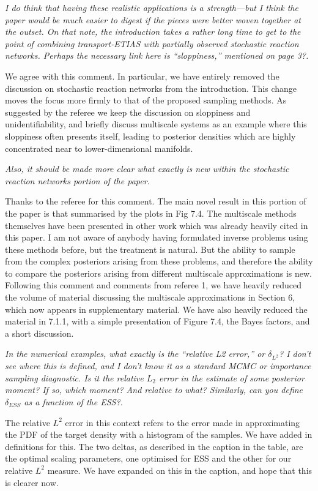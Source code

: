 \documentclass{article}
\newcommand{\comment}[2]{\vspace{0.6cm}{\bf Comment:} {\it #1.}

\vspace{0.3cm}{\bf Answer:} #2}
\begin{document}
\comment{I do think that having these realistic applications is a strength—but I think the paper would be much easier to digest if the pieces were better woven together at the outset. On that note, the introduction takes a rather long time to get to the point of combining transport-ETIAS with partially observed stochastic reaction networks. Perhaps the necessary link here is “sloppiness,” mentioned on page 3?}{We agree with this comment. In particular, we have entirely removed the discussion on stochastic reaction networks from the introduction. This change moves the focus more firmly to that of the proposed sampling methods. As suggested by the referee we keep the discussion on sloppiness and unidentifiability, and briefly discuss multiscale systems as an example where this sloppiness often presents itself, leading to posterior densities which are highly concentrated near to lower-dimensional manifolds.}



\comment{Also, it should be made more clear what exactly is new within the stochastic reaction networks portion of the paper}{Thanks to the referee for this comment. The main novel result in this portion of the paper is that summarised by the plots in Fig 7.4. The multiscale methods themselves have been presented in other work which was already heavily cited in this paper. I am not aware of anybody having formulated inverse problems using these methods before, but the treatment is natural. But the ability to sample from the complex posteriors arising from these problems, and therefore the ability to compare the posteriors arising from different multiscale approximations is new. Following this comment and comments from referee 1, we have heavily reduced the volume of material discussing the multiscale approximations in Section 6, which now appears in supplementary material. We have also heavily reduced the material in 7.1.1, with a simple presentation of Figure 7.4, the Bayes factors, and a short discussion.}


\comment{In the numerical examples, what exactly is the “relative L2 error,” or $\delta_{L^2}$? I don’t see where this is defined, and I don’t know it as a standard MCMC or importance sampling diagnostic. Is it the relative $L_2$ error in the estimate of some posterior moment? If so, which moment? And relative to what? Similarly, can you define $\delta_{ESS}$ as a function of the ESS?}{The relative $L^2$ error in this context refers to the error made in approximating the PDF of the target density with a histogram of the samples. We have added in definitions for this. The two deltas, as described in the caption in the table, are the optimal scaling parameters, one optimised for ESS and the other for our relative $L^2$ measure. We have expanded on this in the caption, and hope that this is clearer now.}
\end{document}
